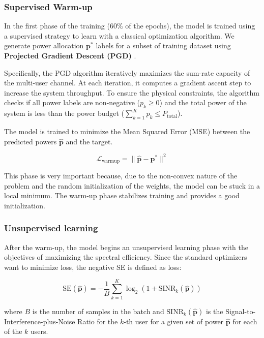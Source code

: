\subsubsection{Supervised Warm-up}\label{sec:task_power_supervised}

In the first phase of the training ($60\%$ of the epochs), the model is trained using a supervised strategy to learn with a classical optimization algorithm. We generate power allocation $\mathbf{p}^{*}$ labels for a subset of training dataset using \textbf{Projected Gradient Descent (PGD)} \cite{boyd2004convex}.

Specifically, the PGD algorithm iteratively maximizes the sum-rate capacity of the multi-user channel. At each iteration, it computes a gradient ascent step to increase the system throughput. To ensure the physical constraints, the algorithm checks if all power labels are non-negative ($p_k \geq 0$) and the total power of the system is less than the power budget ($\sum_{k=1}^{K} p_k \leq P_{\text{total}}$).

The model is trained to minimize the Mean Squared Error (MSE) between the predicted powers $\hat{\mathbf{p}}$ and the target.

\begin{equation}
    \mathcal{L}_{\text{warmup}} = \|\hat{\mathbf{p}} - \mathbf{p}^*\|^2
\end{equation}

This phase is very important because, due to the non-convex nature of the problem and the random initialization of the weights, the model can be stuck in a local minimum. The warm-up phase stabilizes training and provides a good initialization.

\subsubsection{Unsupervised learning}\label{sec:task_power_unsupervised}

After the warm-up, the model begins an unsupervised learning phase with the objectives of maximizing the spectral efficiency. Since the standard optimizers want to minimize loss, the negative SE is defined as loss:

\begin{equation}
    \text{SE}(\hat{\mathbf{p}}) = - \frac{1}{B} \sum_{k=1}^{K} \log_2 \left( 1 + \text{SINR}_k(\hat{\mathbf{p}}) \right)
\end{equation}

where $B$ is the number of samples in the batch and $\text{SINR}_k(\hat{\mathbf{p}})$ is the Signal-to-Interference-plus-Noise Ratio for the $k$-th user for a given set of power $\hat{\mathbf{p}}$ for each of the $k$ users.

